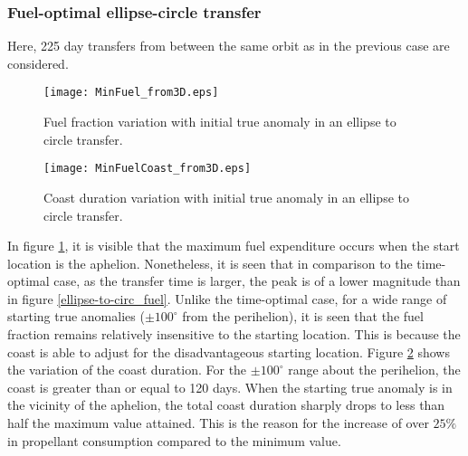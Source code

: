 \subsubsection{Fuel-optimal ellipse-circle transfer}
Here, 225 day transfers from between the same orbit as in the previous case are considered.
\begin{figure}[H]
	\centering\texttt{[image: MinFuel\_from3D.eps]}
	\caption{Fuel fraction variation with initial true anomaly in an ellipse to circle transfer.}
	\label{ellipse-to-circ_minfuel}
\end{figure}
\begin{figure}[H]
	\centering\texttt{[image: MinFuelCoast\_from3D.eps]}
	\caption{Coast duration variation with initial true anomaly in an ellipse to circle transfer.}
	\label{ellipse-to-cir_coast}
\end{figure}
In figure \ref{ellipse-to-circ_minfuel}, it is visible that the maximum fuel expenditure occurs when the start location is the aphelion. Nonetheless, it is seen that in comparison to the time-optimal case, as the transfer time is larger, the peak is of a lower magnitude than in figure \ref{ellipse-to-circ_fuel}. Unlike the time-optimal case, for a wide range of starting true anomalies ($\pm 100^\circ$ from the perihelion), it is seen that the fuel fraction remains relatively insensitive to the starting location. This is because the coast is able to adjust for the disadvantageous starting location. 
Figure \ref{ellipse-to-cir_coast} shows the variation of the coast duration. For the $\pm 100^\circ$ range about the perihelion, the coast is greater than or equal to 120 days. When the starting true anomaly is in the vicinity of the aphelion, the total coast duration sharply drops to less than half the maximum value attained. This is the reason for the increase of over $25\%$ in propellant consumption compared to the minimum value.

